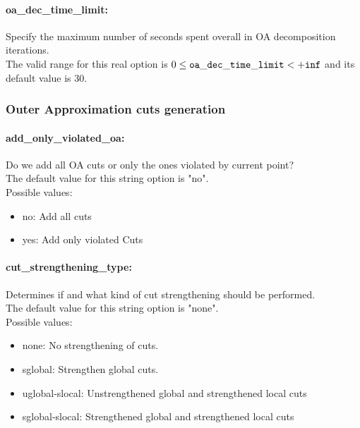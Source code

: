 \paragraph{oa\_dec\_time\_limit:}\label{sec:oa_dec_time_limit} Specify the maximum number of seconds spent overall in OA decomposition iterations. $\;$ \\
 The valid range for this real option is 
$0 \le {\tt oa\_dec\_time\_limit } <  {\tt +inf}$
and its default value is $30$.


\subsubsection{Outer Approximation cuts generation}
\label{sec:Outer_Approximation_cuts_generation}

\paragraph{add\_only\_violated\_oa:}\label{sec:add_only_violated_oa} Do we add all OA cuts or only the ones violated by current point? $\;$ \\
The default value for this string option is "no".
\\ 
Possible values:
\begin{itemize}
   \item no: Add all cuts
   \item yes: Add only violated Cuts
\end{itemize}

\paragraph{cut\_strengthening\_type:}\label{sec:cut_strengthening_type} Determines if and what kind of cut strengthening should be performed. $\;$ \\
The default value for this string option is "none".
\\ 
Possible values:
\begin{itemize}
   \item none: No strengthening of cuts.
   \item sglobal: Strengthen global cuts.
   \item uglobal-slocal: Unstrengthened global and strengthened local
cuts
   \item sglobal-slocal: Strengthened global and strengthened local cuts
\end{itemize}

